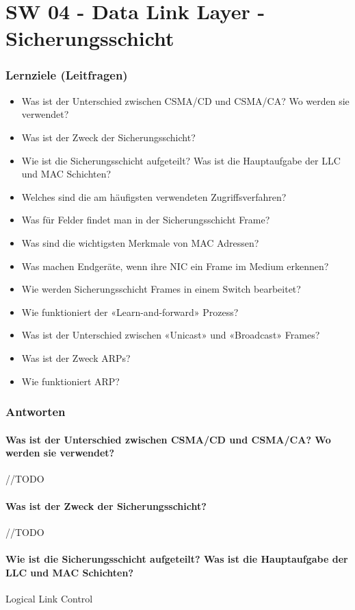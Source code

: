 \part{SW 04 - Data Link Layer - Sicherungsschicht}
\section{Lernziele (Leitfragen)}
\begin{itemize}
    \item Was ist der Unterschied zwischen CSMA/CD und CSMA/CA? Wo werden sie verwendet?
    \item Was ist der Zweck der Sicherungsschicht?
    \item Wie ist die Sicherungsschicht aufgeteilt? Was ist die Hauptaufgabe der LLC und MAC Schichten?
    \item Welches sind die am häufigsten verwendeten Zugriffsverfahren?
    \item Was für Felder findet man in der Sicherungsschicht Frame?
    \item Was sind die wichtigsten Merkmale von MAC Adressen?
    \item Was machen Endgeräte, wenn ihre NIC ein Frame im Medium erkennen?
    \item Wie werden Sicherungsschicht Frames in einem Switch bearbeitet?
    \item Wie funktioniert der «Learn-and-forward» Prozess?
    \item Was ist der Unterschied zwischen «Unicast» und «Broadcast» Frames?
    \item Was ist der Zweck ARPs?
    \item Wie funktioniert ARP?
\end{itemize}

\section{Antworten}
\subsection*{Was ist der Unterschied zwischen CSMA/CD und CSMA/CA? Wo werden sie verwendet?}
//TODO
\subsection*{Was ist der Zweck der Sicherungsschicht?}
//TODO
\subsection*{Wie ist die Sicherungsschicht aufgeteilt? Was ist die Hauptaufgabe der LLC und MAC Schichten?}
Logical Link Control
